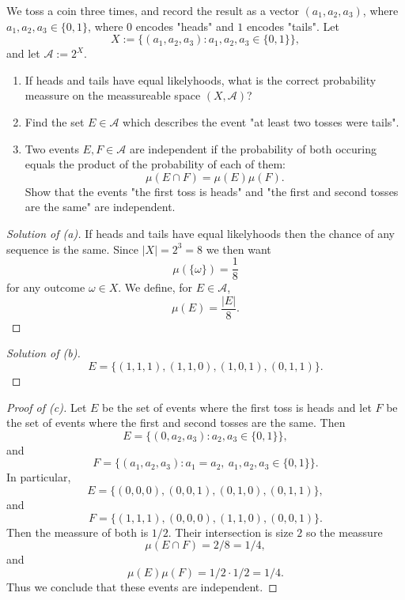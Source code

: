 \begin{prob*}[5]
    We toss a coin three times, and record the result as a 
    vector $(a_1,a_2,a_3)$, where $a_1,a_2,a_3 \in \{0,1\}$, where 
    $0$ encodes "heads" and $1$ encodes "tails". Let 
    \[
        X := \{(a_1,a_2,a_3) : a_1,a_2,a_3 \in \{0,1\}\},
    \]
    and let $\mathcal A := 2^X$.

    \begin{enumerate}[label=\alph*)]
        \item If heads and tails have equal likelyhoods, what is the 
            correct probability meassure on the meassureable 
            space $(X,\mathcal A)$?
        \item Find the set $E \in \mathcal A$ which describes the 
            event "at least two tosses were tails".
        \item Two events $E,F \in \mathcal A$ are independent if 
            the probability of both occuring equals the 
            product of the probability of each of them: 
            \[
                \mu(E \cap F) = \mu(E)\mu(F).
            \]
            Show that the events "the first toss is heads" and 
            "the first and second tosses are the same" are 
            independent.
    \end{enumerate}
\end{prob*}
\begin{proof}[Solution of (a)]
    If heads and tails have equal likelyhoods then 
    the chance of any sequence is the same. Since 
    $|X| = 2^3 = 8$ we then want 
    \[
        \mu(\{\omega\}) = \frac{1}{8} 
    \]
    for any outcome $\omega \in X$.
    We define, for $E \in \mathcal A$, 
    \[
        \mu(E) = \frac{|E|}{8}.
    \]
\end{proof}
\begin{proof}[Solution of (b)]
    \[
        E = \{(1,1,1),(1,1,0),(1,0,1),(0,1,1)\}.
    \]
\end{proof}
\begin{proof}[Proof of (c)]
    Let $E$ be the set of events where the first toss is heads 
    and let $F$ be the set of events where the first and second 
    tosses are the same. Then 
    \[
        E = \{(0,a_2,a_3) : a_2,a_3 \in \{0,1\}\},
    \]
    and 
    \[
        F = \{(a_1,a_2,a_3) : a_1 = a_2, \ a_1,a_2,a_3 \in \{0,1\}\}.
    \]
    In particular, 
    \[
        E = \{(0,0,0), (0,0,1), (0,1,0), (0,1,1)\}, 
    \]
    and 
    \[
        F = \{(1,1,1), (0,0,0), (1,1,0), (0,0,1)\}.
    \]
    Then the meassure of both is $1/2$. Their intersection 
    is size $2$ so the meassure 
    \[
        \mu(E\cap F) = 2/8 = 1/4,
    \]
    and 
    \[
        \mu(E)\mu(F) = 1/2 \cdot 1/2 = 1/4.
    \]
    Thus we conclude that these events are independent.
\end{proof}

